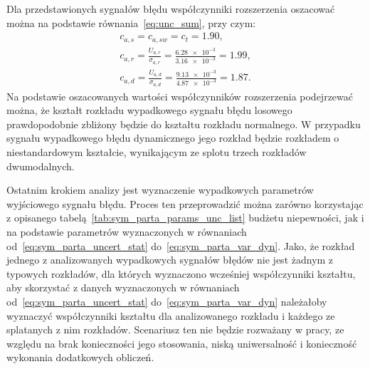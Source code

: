 Dla przedstawionych sygnałów błędu współczynniki rozszerzenia oszacować można na podstawie równania~\eqref{eq:unc_sum}, przy czym:
\begin{gather}
c_{a,s} = c_{a,sw} = c_{t} = 1.90 \label{eq:sym_parta_factor_sta}, \\
c_{a,r} = \frac{U_{a,r}}{\sigma_{a,r}} = \frac{\num{6.28e-3}}{\num{3.16e-3}} = 1.99 \label{eq:sym_parta_factor_rand}, \\
c_{a,d} = \frac{U_{a,d}}{\sigma_{a,d}} = \frac{\num{9.13e-3}}{\num{4.87e-3}} = 1.87 \label{eq:sym_parta_factor_dyn}.
\end{gather}
Na podstawie oszacowanych wartości współczynników rozszerzenia podejrzewać można, że kształt rozkładu wypadkowego sygnału błędu losowego prawdopodobnie zbliżony będzie do kształtu rozkładu normalnego. W przypadku sygnału wypadkowego błędu dynamicznego jego rozkład będzie rozkładem o niestandardowym kształcie, wynikającym ze splotu trzech rozkładów dwumodalnych.

Ostatnim krokiem analizy jest wyznaczenie wypadkowych parametrów wyjściowego sygnału błędu. Proces ten przeprowadzić można zarówno korzystając z opisanego tabelą~\ref{tab:sym_parta_params_unc_list} budżetu niepewności, jak i na podstawie parametrów wyznaczonych w równaniach od~\eqref{eq:sym_parta_uncert_stat} do~\eqref{eq:sym_parta_var_dyn}. Jako, że rozkład jednego z analizowanych wypadkowych sygnałów błędów nie jest żadnym z typowych rozkładów, dla których wyznaczono wcześniej współczynniki kształtu, aby skorzystać z danych wyznaczonych w równaniach od~\eqref{eq:sym_parta_uncert_stat} do~\eqref{eq:sym_parta_var_dyn} należałoby wyznaczyć współczynniki kształtu dla analizowanego rozkładu i każdego ze splatanych z nim rozkładów. Scenariusz ten nie będzie rozważany w pracy, ze względu na brak konieczności jego stosowania, niską uniwersalność i konieczność wykonania dodatkowych obliczeń.

